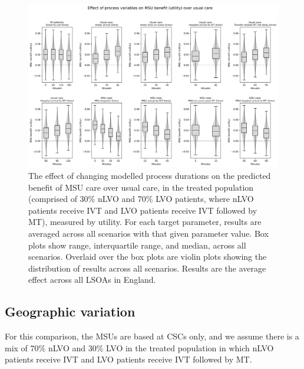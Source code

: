 \begin{figure}[h!]
    \centering
    \includegraphics[width=1\linewidth]{images/msu_net_utility_benefit.png}
    \caption{The effect of changing modelled process durations on the predicted benefit of MSU care over usual care, in the treated population (comprised of 30\% nLVO and 70\% LVO patients, where nLVO patients receive IVT and LVO patients receive IVT followed by MT), measured by utility. For each target parameter, results are averaged across all scenarios with that given parameter value. Box plots show range, interquartile range, and median, across all scenarios. Overlaid over the box plots are violin plots showing the distribution of results across all scenarios. Results are the average effect across all LSOAs in England.}
    \label{fig:scenarios_utility}
\end{figure}

\subsection{Geographic variation}

For this comparison, the MSUs are based at CSCs only, and we assume there is a mix of 70\% nLVO and 30\% LVO in the treated population  in which nLVO patients receive IVT and LVO patients receive IVT followed by MT.

